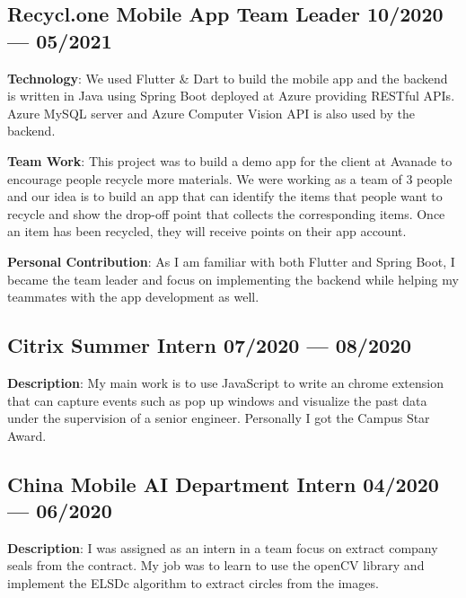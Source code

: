 
\subsection{{Recycl.one Mobile App Team Leader
    \hfill 10/2020 --- 05/2021}}
\begin{zitemize}
    \item \textbf{Technology}: We used Flutter \& Dart to build the mobile app and
        the backend is written in Java using Spring Boot deployed at Azure 
        providing RESTful APIs.
        Azure MySQL server and Azure Computer Vision API is also used by the 
        backend.
    \item \textbf{Team Work}: This project was to build a demo app for the client
        at Avanade to encourage people recycle more materials. We were working
        as a team of 3 people and our idea is to build an app that can identify
        the items that people want to recycle and show the drop-off point that 
        collects the corresponding items. Once an item has been recycled, they 
        will receive points on their app account.
    \item \textbf{Personal Contribution}: As I am familiar with both Flutter and
        Spring Boot, I became the team leader and focus on implementing the 
        backend while helping my teammates with the app development as well. 
\end{zitemize}

\subsection{{Citrix Summer Intern
    \hfill 07/2020 --- 08/2020}}
\begin{zitemize}
    \item \textbf{Description}: My main work is to use JavaScript to write an
        chrome extension that can capture events such as pop up windows
        and visualize the past data under the supervision of a senior engineer.
        Personally I got the Campus Star Award.
\end{zitemize}

\subsection{{China Mobile AI Department Intern
    \hfill 04/2020 --- 06/2020}}
\begin{zitemize}
    \item \textbf{Description}: I was assigned as an intern in a team focus on
        extract company seals from the contract. My job was to learn to use the
        openCV library and implement the ELSDc algorithm to extract circles
        from the images.
\end{zitemize}

